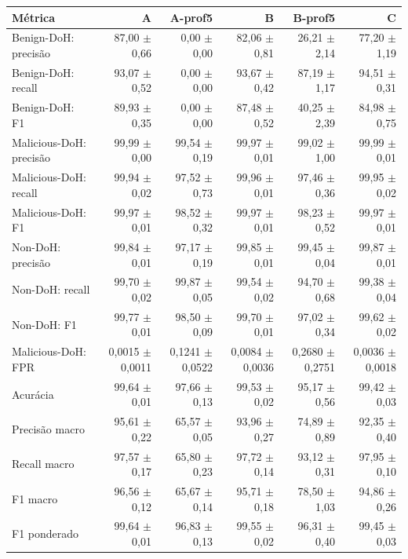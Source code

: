 \begin{tabular}{lrrrrr}
\hline
\textbf{Métrica} & \textbf{A} & \textbf{A-prof5} & \textbf{B} & \textbf{B-prof5} & \textbf{C} \\ \hline
Benign-DoH: precisão & 87,00 $\pm$ 0,66 & 0,00 $\pm$ 0,00 & 82,06 $\pm$ 0,81 & 26,21 $\pm$ 2,14 & 77,20 $\pm$ 1,19 \\
Benign-DoH: recall & 93,07 $\pm$ 0,52 & 0,00 $\pm$ 0,00 & 93,67 $\pm$ 0,42 & 87,19 $\pm$ 1,17 & 94,51 $\pm$ 0,31 \\
Benign-DoH: F1 & 89,93 $\pm$ 0,35 & 0,00 $\pm$ 0,00 & 87,48 $\pm$ 0,52 & 40,25 $\pm$ 2,39 & 84,98 $\pm$ 0,75 \\
Malicious-DoH: precisão & 99,99 $\pm$ 0,00 & 99,54 $\pm$ 0,19 & 99,97 $\pm$ 0,01 & 99,02 $\pm$ 1,00 & 99,99 $\pm$ 0,01 \\
Malicious-DoH: recall & 99,94 $\pm$ 0,02 & 97,52 $\pm$ 0,73 & 99,96 $\pm$ 0,01 & 97,46 $\pm$ 0,36 & 99,95 $\pm$ 0,02 \\
Malicious-DoH: F1 & 99,97 $\pm$ 0,01 & 98,52 $\pm$ 0,32 & 99,97 $\pm$ 0,01 & 98,23 $\pm$ 0,52 & 99,97 $\pm$ 0,01 \\
Non-DoH: precisão & 99,84 $\pm$ 0,01 & 97,17 $\pm$ 0,19 & 99,85 $\pm$ 0,01 & 99,45 $\pm$ 0,04 & 99,87 $\pm$ 0,01 \\
Non-DoH: recall & 99,70 $\pm$ 0,02 & 99,87 $\pm$ 0,05 & 99,54 $\pm$ 0,02 & 94,70 $\pm$ 0,68 & 99,38 $\pm$ 0,04 \\
Non-DoH: F1 & 99,77 $\pm$ 0,01 & 98,50 $\pm$ 0,09 & 99,70 $\pm$ 0,01 & 97,02 $\pm$ 0,34 & 99,62 $\pm$ 0,02 \\
Malicious-DoH: FPR & 0,0015 $\pm$ 0,0011 & 0,1241 $\pm$ 0,0522 & 0,0084 $\pm$ 0,0036 & 0,2680 $\pm$ 0,2751 & 0,0036 $\pm$ 0,0018 \\
\hline
Acurácia & 99,64 $\pm$ 0,01 & 97,66 $\pm$ 0,13 & 99,53 $\pm$ 0,02 & 95,17 $\pm$ 0,56 & 99,42 $\pm$ 0,03 \\
Precisão macro & 95,61 $\pm$ 0,22 & 65,57 $\pm$ 0,05 & 93,96 $\pm$ 0,27 & 74,89 $\pm$ 0,89 & 92,35 $\pm$ 0,40 \\
Recall macro & 97,57 $\pm$ 0,17 & 65,80 $\pm$ 0,23 & 97,72 $\pm$ 0,14 & 93,12 $\pm$ 0,31 & 97,95 $\pm$ 0,10 \\
F1 macro & 96,56 $\pm$ 0,12 & 65,67 $\pm$ 0,14 & 95,71 $\pm$ 0,18 & 78,50 $\pm$ 1,03 & 94,86 $\pm$ 0,26 \\
F1 ponderado & 99,64 $\pm$ 0,01 & 96,83 $\pm$ 0,13 & 99,55 $\pm$ 0,02 & 96,31 $\pm$ 0,40 & 99,45 $\pm$ 0,03 \\
\hline
\end{tabular}
